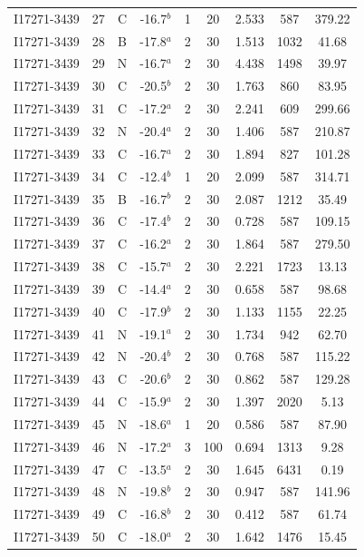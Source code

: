 \begin{table}
\begin{tabular}{ccccccccc}
I17271-3439 & 27 & C & -16.7$^{b}$ & 1 & 20 & 2.533 & 587 & 379.22 \\
I17271-3439 & 28 & B & -17.8$^{a}$ & 2 & 30 & 1.513 & 1032 & 41.68 \\
I17271-3439 & 29 & N & -16.7$^{a}$ & 2 & 30 & 4.438 & 1498 & 39.97 \\
I17271-3439 & 30 & C & -20.5$^{b}$ & 2 & 30 & 1.763 & 860 & 83.95 \\
I17271-3439 & 31 & C & -17.2$^{a}$ & 2 & 30 & 2.241 & 609 & 299.66 \\
I17271-3439 & 32 & N & -20.4$^{a}$ & 2 & 30 & 1.406 & 587 & 210.87 \\
I17271-3439 & 33 & C & -16.7$^{a}$ & 2 & 30 & 1.894 & 827 & 101.28 \\
I17271-3439 & 34 & C & -12.4$^{b}$ & 1 & 20 & 2.099 & 587 & 314.71 \\
I17271-3439 & 35 & B & -16.7$^{b}$ & 2 & 30 & 2.087 & 1212 & 35.49 \\
I17271-3439 & 36 & C & -17.4$^{b}$ & 2 & 30 & 0.728 & 587 & 109.15 \\
I17271-3439 & 37 & C & -16.2$^{a}$ & 2 & 30 & 1.864 & 587 & 279.50 \\
I17271-3439 & 38 & C & -15.7$^{a}$ & 2 & 30 & 2.221 & 1723 & 13.13 \\
I17271-3439 & 39 & C & -14.4$^{a}$ & 2 & 30 & 0.658 & 587 & 98.68 \\
I17271-3439 & 40 & C & -17.9$^{b}$ & 2 & 30 & 1.133 & 1155 & 22.25 \\
I17271-3439 & 41 & N & -19.1$^{a}$ & 2 & 30 & 1.734 & 942 & 62.70 \\
I17271-3439 & 42 & N & -20.4$^{b}$ & 2 & 30 & 0.768 & 587 & 115.22 \\
I17271-3439 & 43 & C & -20.6$^{b}$ & 2 & 30 & 0.862 & 587 & 129.28 \\
I17271-3439 & 44 & C & -15.9$^{a}$ & 2 & 30 & 1.397 & 2020 & 5.13 \\
I17271-3439 & 45 & N & -18.6$^{a}$ & 1 & 20 & 0.586 & 587 & 87.90 \\
I17271-3439 & 46 & N & -17.2$^{a}$ & 3 & 100 & 0.694 & 1313 & 9.28 \\
I17271-3439 & 47 & C & -13.5$^{a}$ & 2 & 30 & 1.645 & 6431 & 0.19 \\
I17271-3439 & 48 & N & -19.8$^{b}$ & 2 & 30 & 0.947 & 587 & 141.96 \\
I17271-3439 & 49 & C & -16.8$^{b}$ & 2 & 30 & 0.412 & 587 & 61.74 \\
I17271-3439 & 50 & C & -18.0$^{a}$ & 2 & 30 & 1.642 & 1476 & 15.45 \\

\end{tabular}
\end{table}
